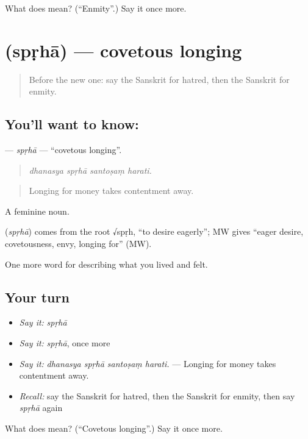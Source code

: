 \begin{tcolorbox}[breakable,colback=teal!4,colframe=teal!35!black,title={Before you move on}]
What does  mean? (\textquotedblleft{}Enmity\textquotedblright{}.) Say it once more.
\end{tcolorbox}
\section[\texorpdfstring{\sk{स्पृहा} (spṛhā)}{स्पृहा (spṛhā)}]{ (spṛhā) — covetous longing}

\label{lesson:SA-C454-sprha}



\begin{quote}
Before the new one: say the Sanskrit for hatred, then the Sanskrit for enmity.
\end{quote}

\subsection*{You'll want to know: }
\textbf{} — \emph{spṛhā} — \textquotedblleft{}covetous longing\textquotedblright{}.

\begin{quote}
   
\end{quote}

\begin{quote}
\emph{dhanasya spṛhā santoṣaṃ harati.}
\end{quote}

\begin{quote}
Longing for money takes contentment away.
\end{quote}

A feminine noun.

\begin{cousinweb}
\textbf{} (\emph{spṛhā}) comes from the root √spṛh, \textquotedblleft{}to desire eagerly\textquotedblright{}; MW gives \textquotedblleft{}eager desire, covetousness, envy, longing for\textquotedblright{} (MW).
\end{cousinweb}

\begin{grammarlens}[title={What you've built}]
One more word for describing what you lived and felt.
\end{grammarlens}

\subsection*{Your turn}
\begin{itemize}
\raggedright
  \item \emph{Say it:} \emph{spṛhā}
  \item \emph{Say it:} \emph{spṛhā}, once more
  \item \emph{Say it:} \emph{dhanasya spṛhā santoṣaṃ harati.} — Longing for money takes contentment away.
  \item \emph{Recall:} say the Sanskrit for hatred, then the Sanskrit for enmity, then say \emph{spṛhā} again
\end{itemize}

\begin{tcolorbox}[breakable,colback=teal!4,colframe=teal!35!black,title={Before you move on}]
What does  mean? (\textquotedblleft{}Covetous longing\textquotedblright{}.) Say it once more.
\end{tcolorbox}
